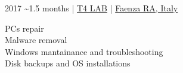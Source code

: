 \documentclass{article}
\begin{document}
\begin{paracol}{2}
\begin{tcolorbox}[title=\emoji{hammer-and-wrench} Computer Technician Internship,colback=white,arc=0pt]
     2017 \textasciitilde 1.5 months \hfill | \hfill
    \href{https://www.t4lab.it/}{ T4 LAB} \hfill | \hfill
    \href{https://www.openstreetmap.org/node/4751590216}{ Faenza RA, Italy}

    \tcblower

     PCs repair \\[4pt]
     Malware removal \\[4pt]
     Windows mantainance and troubleshooting \\[4pt]
     Disk backups and OS installations
\end{tcolorbox}

\end{paracol}
\end{document}
